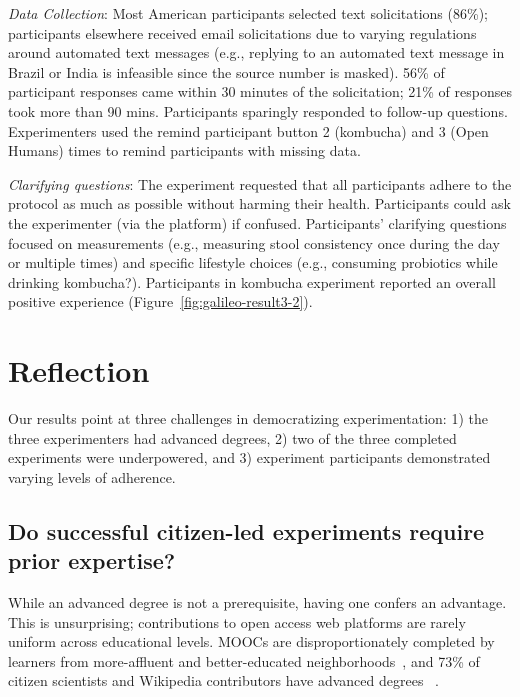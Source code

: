 \textit{Data Collection}: Most American participants selected text solicitations (86\%); participants elsewhere received email solicitations due to varying regulations around automated text messages (e.g., replying to an automated text message in Brazil or India is infeasible since the source number is masked). 56\% of participant responses came within 30 minutes of the solicitation; 21\% of responses took more than 90 mins. Participants sparingly responded to follow-up questions. Experimenters used the remind participant button 2 (kombucha) and 3 (Open Humans) times to remind participants with missing data.

\textit{Clarifying questions}: The experiment requested that all participants adhere to the protocol as much as possible without harming their health. Participants could ask the experimenter (via the platform) if confused. Participants' clarifying questions focused on measurements (e.g., measuring stool consistency once during the day or multiple times) and specific lifestyle choices (e.g., consuming probiotics while drinking kombucha?). Participants in kombucha experiment reported an overall positive experience (Figure~\ref{fig:galileo-result3-2}).

\section{Reflection}
Our results point at three challenges in democratizing experimentation: 1) the three experimenters had advanced degrees, 2) two of the three completed experiments were underpowered, and 3) experiment participants demonstrated varying levels of adherence. 

\subsection{Do successful citizen-led experiments require prior expertise?}
While an advanced degree is not a prerequisite, having one confers an advantage. This is unsurprising; contributions to open access web platforms are rarely uniform across educational levels. MOOCs are disproportionately completed by learners from more-affluent and better-educated neighborhoods~\cite{hansen2015democratizing}, and 73\% of citizen scientists and Wikipedia contributors have advanced degrees~\cite{national2018learning, Wikipedia} . 

